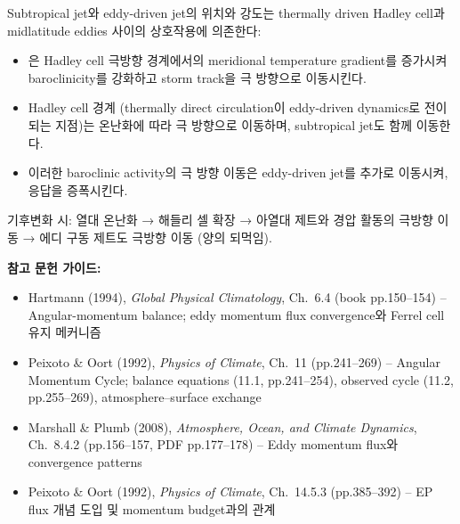 \begin{remark}
Subtropical jet와 eddy-driven jet의 위치와 강도는 thermally driven Hadley cell과 midlatitude eddies 사이의 상호작용에 의존한다:
\begin{itemize}
\item {}은 Hadley cell 극방향 경계에서의 meridional temperature gradient를 증가시켜 baroclinicity를 강화하고 storm track을 극 방향으로 이동시킨다.
\item Hadley cell 경계 (thermally direct circulation이 eddy-driven dynamics로 전이되는 지점)는 온난화에 따라 극 방향으로 이동하며, subtropical jet도 함께 이동한다.
\item 이러한 baroclinic activity의 극 방향 이동은 eddy-driven jet를 추가로 이동시켜, 응답을 증폭시킨다.
\end{itemize}
\end{remark}

\begin{hisublock}
기후변화 시: 열대 온난화 → 해들리 셀 확장 → 아열대 제트와 경압 활동의 극방향 이동 → 에디 구동 제트도 극방향 이동 (양의 되먹임).
\end{hisublock}


\begin{hisublock}
\textbf{참고 문헌 가이드:}
\begin{itemize}
  \item Hartmann (1994), \textit{Global Physical Climatology}, Ch.~6.4 (book pp.150--154) -- Angular-momentum balance; eddy momentum flux convergence와 Ferrel cell 유지 메커니즘 
  \item Peixoto \& Oort (1992), \textit{Physics of Climate}, Ch.~11 (pp.241--269) -- Angular Momentum Cycle; balance equations (11.1, pp.241--254), observed cycle (11.2, pp.255--269), atmosphere--surface exchange 
  \item Marshall \& Plumb (2008), \textit{Atmosphere, Ocean, and Climate Dynamics}, Ch.~8.4.2 (pp.156--157, PDF pp.177--178) -- Eddy momentum flux와 convergence patterns
  \item Peixoto \& Oort (1992), \textit{Physics of Climate}, Ch.~14.5.3 (pp.385--392) -- EP flux 개념 도입 및 momentum budget과의 관계 
\end{itemize}
\end{hisublock}


